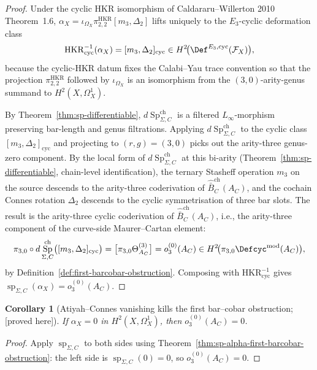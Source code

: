 \documentclass[11pt,reqno]{amsart}
\theoremstyle{plain}
\newtheorem{corollary}[theorem]{Corollary}
\theoremstyle{definition}
\theoremstyle{remark}
\providecommand{\ClaimStatusProvedHere}{\textnormal{[proved here]}}
\DeclareMathOperator{\Sp}{Sp}
\begin{document}
\begin{proof}
Under the cyclic HKR isomorphism of Caldararu--Willerton 2010
Theorem~1.6, $\alpha_X=\iota_{\Omega_X}\pi^{\mathrm{HKR}}_{2,2}[m_3,\Delta_2]$
lifts uniquely to the $E_3$-cyclic deformation class
\[
  \mathrm{HKR}^{-1}_{\mathrm{cyc}}(\alpha_X)
  =[m_3,\Delta_2]_{\mathrm{cyc}}
  \in H^2\!\bigl(\Def^{E_3,\mathrm{cyc}}(\mathcal F_X)\bigr),
\]
because the cyclic-HKR datum fixes the Calabi--Yau trace convention so
that the projection $\pi^{\mathrm{HKR}}_{2,2}$ followed by
$\iota_{\Omega_X}$ is an isomorphism from the $(3,0)$-arity-genus
summand to $H^2(X,\Omega_X^1)$.

By Theorem~\ref{thm:sp-differentiable}, $d\Sp^{\mathrm{ch}}_{\Sigma,C}$
is a filtered $L_\infty$-morphism preserving bar-length and genus
filtrations. Applying $d\Sp^{\mathrm{ch}}_{\Sigma,C}$ to the cyclic
class $[m_3,\Delta_2]_{\mathrm{cyc}}$ and projecting to
$(r,g)=(3,0)$ picks out the arity-three genus-zero component. By the
local form of $d\Sp^{\mathrm{ch}}_{\Sigma,C}$ at this bi-arity
(Theorem~\ref{thm:sp-differentiable}, chain-level identification), the
ternary Stasheff operation $m_3$ on the source descends to the
arity-three coderivation of $\widehat{\bar B}^{\mathrm{ch}}_C(A_C)$,
and the cochain Connes rotation $\Delta_2$ descends to the cyclic
symmetrisation of three bar slots. The result is the arity-three
cyclic coderivation of $\widehat{\bar B}^{\mathrm{ch}}_C(A_C)$, i.e.,
the arity-three component of the curve-side Maurer--Cartan element:
\[
  \pi_{3,0}\circ d\Sp^{\mathrm{ch}}_{\Sigma,C}
  \bigl([m_3,\Delta_2]_{\mathrm{cyc}}\bigr)
  =\bigl[\pi_{3,0}\Theta_{A_C}^{(3)}\bigr]
  =o^{(0)}_3(A_C)
  \in H^2\!\bigl(\pi_{3,0}\Defcyc^{\mathrm{mod}}(A_C)\bigr),
\]
by Definition~\ref{def:first-barcobar-obstruction}. Composing with
$\mathrm{HKR}^{-1}_{\mathrm{cyc}}$ gives
$\operatorname{sp}_{\Sigma,C}(\alpha_X)=o^{(0)}_3(A_C)$.
\end{proof}

\begin{corollary}[Atiyah--Connes vanishing kills the first bar--cobar obstruction; \ClaimStatusProvedHere]
\label{cor:alpha-vanish-kills-o3}
If $\alpha_X=0$ in $H^2(X,\Omega_X^1)$, then $o^{(0)}_3(A_C)=0$.
\end{corollary}

\begin{proof}
Apply $\operatorname{sp}_{\Sigma,C}$ to both sides using
Theorem~\ref{thm:sp-alpha-first-barcobar-obstruction}: the left side
is $\operatorname{sp}_{\Sigma,C}(0)=0$, so
$o^{(0)}_3(A_C)=0$.
\end{proof}
\end{document}
